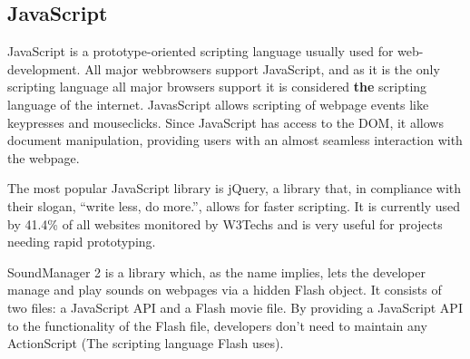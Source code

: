 \subsection{JavaScript}
JavaScript is a prototype-oriented scripting language usually used for
web-development. All major webbrowsers support JavaScript, and as it is the only
scripting language all major browsers support it is considered \textbf{the}
scripting language of the internet. 
JavasScript allows scripting of webpage events like keypresses and mouseclicks.
Since JavaScript has access to the DOM, it allows document manipulation,
providing users with an almost seamless interaction with the webpage.

The most popular JavaScript library is jQuery, 
a library that, in compliance with their slogan, ``write less, do more.'', 
allows for faster scripting. It is currently used by 41.4\% of all
websites monitored by W3Techs \cite{W3Tech11} and is very useful for projects
needing rapid prototyping.

SoundManager 2 is a library which, as the name implies, lets the developer
manage and play sounds on webpages via a hidden Flash object. It consists of two
files: a JavaScript API and a Flash movie file. By providing a
JavaScript API to the functionality of the Flash file, developers don't need to
maintain any ActionScript (The scripting language Flash uses).
\cite{Schiller07}
